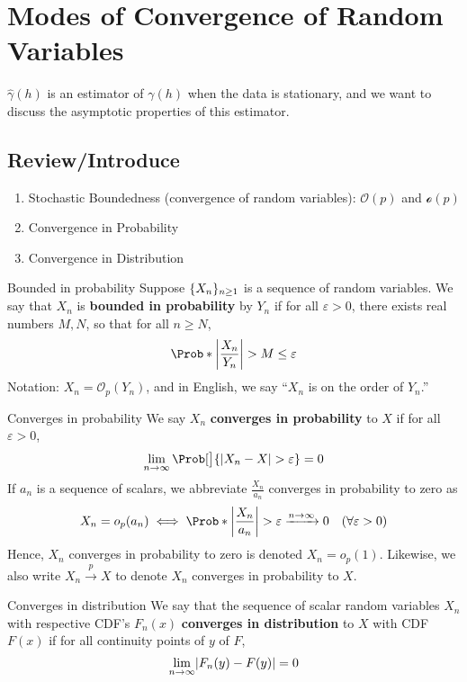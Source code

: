 \section{Modes of Convergence of Random Variables}
$ \hat{\gamma}(h) $ is an estimator of $ \gamma(h) $ when the data is stationary,
and we want to discuss the asymptotic properties of this estimator.

\subsection{Review/Introduce}
\begin{enumerate}[(1)]
    \item Stochastic Boundedness (convergence of random variables): $ \mathcal{O}(p) $
          and $ \mathcal{o}(p) $
    \item Convergence in Probability
    \item Convergence in Distribution
\end{enumerate}
\begin{Definition}{Bounded in probability}{}
    Suppose $ \{X_n\}_{n\ge 1} $ is a sequence of random variables.
    We say that $ X_n $ is \textbf{bounded in probability}
    by $ Y_n $ if for all $ \varepsilon>0 $, there exists real numbers
    $ M,N $, so that for all $ n\ge N $,
    \[ \Prob*{\abs*{\frac{X_n}{Y_n}}> M}\le \varepsilon
    \]
    Notation: $ X_n=\mathcal{O}_p(Y_n) $, and in English, we say
    ``$ X_n $ is on the order of $ Y_n $.''
\end{Definition}
\begin{Definition}{Converges in probability}{}
    We say $ X_n $ \textbf{converges in probability}
    to $ X $ if for all $ \varepsilon>0 $,
    \[ \lim\limits_{{n} \to {\infty}} \Prob[\big]{\abs{X_n-X}>\varepsilon}=0 \]
    If $ a_n $ is a sequence of scalars, we abbreviate
    $ \displaystyle \frac{X_n}{a_n} $
    converges in probability to zero as
    \[ X_n=o_p(a_n)\iff \Prob*{\abs*{\frac{X_n}{a_n}}>\varepsilon}\xrightarrow{n\to\infty}0
        \quad (\forall\varepsilon>0) \]
    Hence, $ X_n $
    converges in probability to zero is denoted $ X_n=o_p(1) $.
    Likewise, we also write $ X_n\stackrel{p}{\to}X $ to denote $ X_n $
    converges in probability to $ X $.
\end{Definition}
\begin{Definition}{Converges in distribution}{}
    We say that the sequence of scalar random variables
    $ X_n $ with respective CDF's $ F_n(x) $
    \textbf{converges in distribution} to $ X $ with CDF $ F(x) $
    if for all continuity points of $ y $ of $ F $,
    \[ \lim\limits_{{n} \to {\infty}} \lvert F_n(y)-F(y)\rvert=0 \]
\end{Definition}
